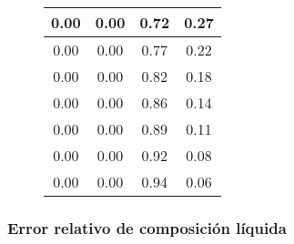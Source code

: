 \begin{figure}[H]
\begin{tabular}{|c|c|c|c|}
        0.00           & 0.00             & 0.72              & 0.27               \\
        \hline
        0.00           & 0.00             & 0.77              & 0.22               \\
        \hline
        0.00           & 0.00             & 0.82              & 0.18               \\
        \hline
        0.00           & 0.00             & 0.86              & 0.14               \\
        \hline
        0.00           & 0.00             & 0.89              & 0.11               \\
        \hline
        0.00           & 0.00             & 0.92              & 0.08               \\
        \hline
        0.00           & 0.00             & 0.94              & 0.06               \\
        \hline
    \end{tabular}
    \normalsize
\end{figure}

\newpage

\subsubsection{Error relativo de composición líquida}

